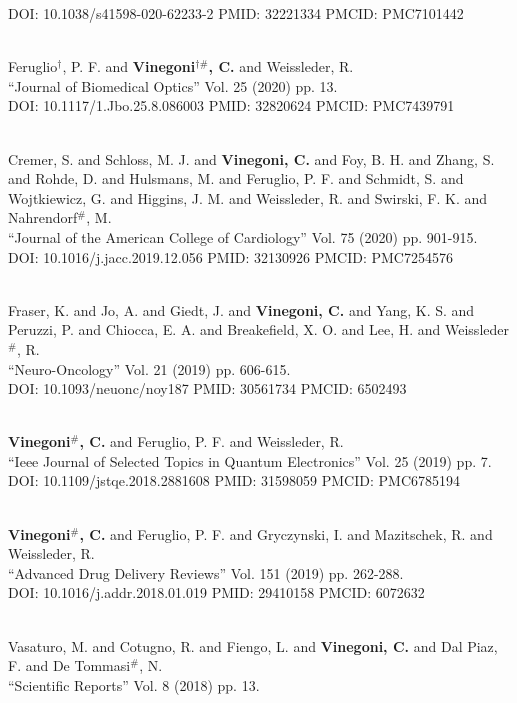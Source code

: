 DOI: 10.1038/s41598-020-62233-2 PMID: 32221334 PMCID: PMC7101442\item {} \\ Feruglio$^\dag$, P. F. and {\bf Vinegoni$^{\dag \#}$, C.} and Weissleder, R. \\ ``Journal of Biomedical Optics'' Vol. 25 (2020) pp. 13. \\ DOI: 10.1117/1.Jbo.25.8.086003 PMID: 32820624 PMCID: PMC7439791\item {} \\ Cremer, S. and Schloss, M. J. and {\bf Vinegoni, C.} and Foy, B. H. and Zhang, S. and Rohde, D. and Hulsmans, M. and Feruglio, P. F. and Schmidt, S. and Wojtkiewicz, G. and Higgins, J. M. and Weissleder, R. and Swirski, F. K. and Nahrendorf$^\#$, M. \\ ``Journal of the American College of Cardiology'' Vol. 75 (2020) pp. 901-915. \\ DOI: 10.1016/j.jacc.2019.12.056 PMID: 32130926 PMCID: PMC7254576\item {} \\ Fraser, K. and Jo, A. and Giedt, J. and {\bf Vinegoni, C.} and Yang, K. S. and Peruzzi, P. and Chiocca, E. A. and Breakefield, X. O. and Lee, H. and Weissleder$^\#$, R. \\ ``Neuro-Oncology'' Vol. 21 (2019) pp. 606-615. \\ DOI: 10.1093/neuonc/noy187 PMID: 30561734 PMCID: 6502493\item {} \\ {\bf Vinegoni$^\#$, C.} and Feruglio, P. F. and Weissleder, R. \\ ``Ieee Journal of Selected Topics in Quantum Electronics'' Vol. 25 (2019) pp. 7. \\ DOI: 10.1109/jstqe.2018.2881608 PMID: 31598059 PMCID: PMC6785194\item {} \\ {\bf Vinegoni$^\#$, C.} and Feruglio, P. F. and Gryczynski, I. and Mazitschek, R. and Weissleder, R. \\ ``Advanced Drug Delivery Reviews'' Vol. 151 (2019) pp. 262-288. \\ DOI: 10.1016/j.addr.2018.01.019 PMID: 29410158 PMCID: 6072632\item {} \\ Vasaturo, M. and Cotugno, R. and Fiengo, L. and {\bf Vinegoni, C.} and Dal Piaz, F. and De Tommasi$^\#$, N. \\ ``Scientific Reports'' Vol. 8 (2018) pp. 13. 